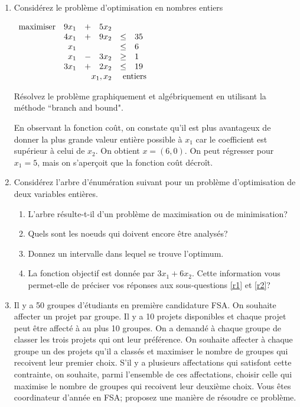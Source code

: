 \begin{enumerate}
  \item Considérez le problème d'optimisation en nombres entiers

    $
    \begin{array}{lrcrcl}
      \maxi & 9x_1 & +&  5 x_2\\
      & 4 x_1 &+& 9 x_2  & \leq & 35 \\
      & x_1    &  &       &  \leq & 6\\
      &   x_1& -&  3x_2  & \geq & 1 \\
      & 3 x_1    & + & 2x_2   &  \leq & 19\\
      &   \multicolumn{3}{r}{x_1, x_2}  & \multicolumn{2}{l}{\mbox{ entiers}}
    \end{array}
    $


    Résolvez le problème graphiquement et algébriquement en utilisant la méthode ``branch and bound".



    \begin{solution}
      En observant la fonction coût, on constate qu'il est plus avantageux de donner la plus grande valeur entière possible à $x_{1}$ car le coefficient est supérieur à celui de $x_{2}$. On obtient $x = (6,0)$. On peut régresser pour $x_{1} = 5$, mais on s'aperçoit que la fonction coût décroît.
    \end{solution}

  \item Considérez l'arbre d'énumération suivant pour un problème d'optimisation de deux variables entières.

    \begin{enumerate}
      \item L'arbre résulte-t-il d'un problème de maximisation ou de minimisation?
      \item \label{r1} Quels sont les
        noeuds qui doivent encore être analysés?
      \item \label{r2} Donnez un intervalle dans lequel se trouve
        l'optimum.
      \item La fonction objectif est donnée
        par $3x_1+6x_2$. Cette information vous permet-elle de préciser vos réponses aux sous-questions \ref{r1} et
        \ref{r2}?
    \end{enumerate}


    \begin{solution}
      \nosolution
    \end{solution}

  \item  Il y a 50 groupes d'étudiants en première candidature FSA. On souhaite affecter un projet par groupe. Il y a 10
    projets disponibles et chaque projet peut être affecté à au plus 10 groupes. On a demandé à chaque groupe de classer les trois projets qui ont leur
    préférence. On souhaite affecter à chaque groupe un des projets qu'il a classés et maximiser le nombre de groupes qui recoivent leur premier choix.
    S'il y a plusieurs affectations qui satisfont cette contrainte, on souhaite, parmi l'ensemble de ces affectations, choisir celle qui maximise le nombre de groupes
    qui recoivent leur deuxième choix. Vous êtes coordinateur d'année en FSA; proposez une manière de résoudre ce problème.



\end{enumerate}
